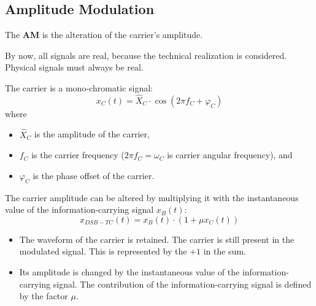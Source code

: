 \begin{refsection}
\label{sec:ch05:am}

\subsection{Amplitude Modulation}

The  \textbf{\acf{AM}} is the alteration of the carrier's amplitude.

\begin{attention}
	By now, all signals are real, because the technical realization is considered. Physical signals must always be real.
\end{attention}

The carrier is a mono-chromatic signal:
\begin{equation}
	x_C(t) = \hat{X}_C \cdot \cos\left(2\pi f_C + \varphi_C\right)
\end{equation}
where
\begin{itemize}
	\item $\hat{X}_C$ is the amplitude of the carrier,
	\item $f_C$ is the carrier frequency ($2\pi f_C = \omega_C$ is carrier angular frequency), and
	\item $\varphi_C$ is the phase offset of the carrier.
\end{itemize}

The carrier amplitude can be altered by multiplying it with the instantaneous value of the information-carrying signal $x_B(t)$:
\begin{equation}
	x_{DSB-TC}(t) = x_B(t) \cdot \left(1 + \mu x_C(t)\right)
	\label{eq:ch05:amdsb_timedomain}
\end{equation}
\begin{itemize}
	\item The waveform of the carrier is retained. The carrier is still present in the modulated signal. This is represented by the $+1$ in the sum.
	\item Its amplitude is changed by the instantaneous value of the information-carrying signal. The contribution of the information-carrying signal is defined by the factor $\mu$.
\end{itemize}

\begin{figure}[H]
	\centering
	

\end{figure}
\end{refsection}
